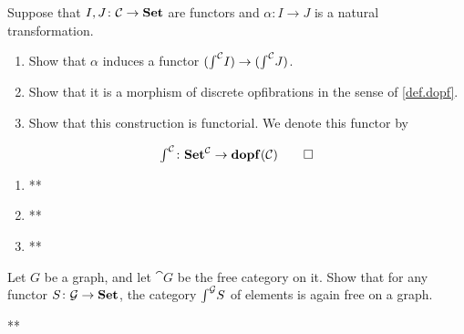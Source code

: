 \documentclass[Book-Poly]{subfiles}
\begin{document}
\begin{exercise}\label{exc.elts_functor}
Suppose that $I,J\colon\mathcal{C}\to\mathbf{Set}$ are functors and $\alpha\colon I\to J$ is a natural transformation. 
\begin{enumerate}
	\item Show that $\alpha$ induces a functor $(\textstyle{\int}^{\mathcal{C}}I)\to(\textstyle{\int}^{\mathcal{C}}J)$.
	\item Show that it is a morphism of discrete opfibrations in the sense of \cref{def.dopf}.
	\item Show that this construction is functorial. We denote this functor by
\end{enumerate}
	\[
	\textstyle{\int}^{\mathcal{C}}\colon\mathbf{Set}^{\mathcal{C}}\to\mathbf{dopf}(\mathcal{C})
\qedhere	
	\]
\begin{solution}
\begin{enumerate}
    \item **
    \item **
    \item **
\end{enumerate}
\end{solution}
\end{exercise}

\begin{exercise}\label{exc.elts_free_grph}
Let $G$ be a graph, and let $\cat{G}$ be the free category on it. Show that for any functor $S\colon\mathcal{G}\to\mathbf{Set}$, the category $\textstyle{\int}^{\mathcal{G}} S$ of elements is again free on a graph.
\begin{solution}
**
\end{solution}
\end{exercise}
\end{document}
